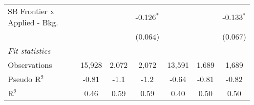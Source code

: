 \begin{tabular}{lcccccc}
   SB Frontier x Applied - Bkg.   &             &               & -0.126$^{*}$   &              &               & -0.133$^{*}$\\   
                                  &             &               & (0.064)        &              &               & (0.067)\\   
   \midrule
   \emph{Fit statistics}\\
   Observations                   & 15,928      & 2,072         & 2,072          & 13,591       & 1,689         & 1,689\\  
   Pseudo R$^2$                   & -0.81       & -1.1          & -1.2           & -0.64        & -0.81         & -0.82\\  
   R$^2$                          & 0.46        & 0.59          & 0.59           & 0.40         & 0.50          & 0.50\\  
   

\end{tabular}
